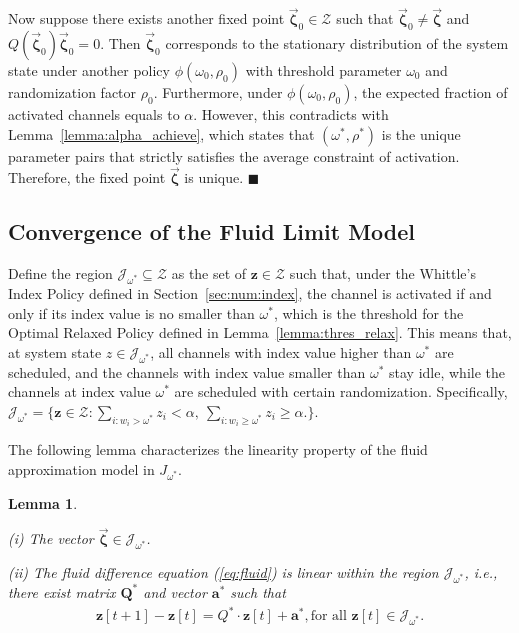 \documentclass[11pt,twocolumn]{IEEEtran}
\newtheorem{lemma}{Lemma}
\begin{document}
Now suppose there exists another fixed point $\vec{\bm \zeta}_0\in \mathcal{Z}$ such that $\vec{\bm \zeta}_0 \neq \vec{\bm \zeta}$ and $Q(\vec{\bm \zeta}_0)\vec{\bm \zeta}_0=0$. Then $\vec{\bm \zeta}_0$ corresponds to the stationary distribution of the system state under another policy $\phi(\omega_0, \rho_0)$ with threshold parameter $\omega_0$ and randomization factor $\rho_0$. Furthermore, under $\phi(\omega_0, \rho_0)$, the expected fraction of activated channels equals to $\alpha$. However, this contradicts with Lemma~\ref{lemma:alpha_achieve}, which states that $(\omega^*, \rho^*)$ is the unique parameter pairs that strictly satisfies the average constraint of activation. Therefore, the fixed point $\vec{\bm \zeta}$ is unique.
 \hfill $\blacksquare$

\subsection{Convergence of the Fluid Limit Model}

Define the region $\mathcal{J}_{\omega^*} \subseteq \mathcal{Z}$ as the set of $\bm z \in \mathcal{Z}$ such that, under the Whittle's Index Policy defined in Section~\ref{sec:num:index}, the channel is activated if and only if its index value is no smaller than $\omega^*$, which is the threshold for the Optimal Relaxed Policy defined in Lemma~\ref{lemma:thres_relax}. This means that, at system state $z \in \mathcal{J}_{\omega^*}$, all channels with index value higher than $\omega^*$ are scheduled, and the channels with index value smaller than $\omega^*$ stay idle, while the channels at index value $\omega^*$ are scheduled with certain randomization. Specifically, $\mathcal{J_{\omega^*}}=\{\bm z {\in} \mathcal{Z}: \sum_{i: w_i > \omega^*} z_i < \alpha, \ \sum_{i: w_i \geq \omega^*}z_i  \geq \alpha.\}$.

The following lemma characterizes the linearity property of the fluid approximation model in $J_{\omega^*}$.
\vspace{3pt}

\begin{lemma}\label{lemma:piecewiseL}

\noindent(i) The vector  $\vec{\bm \zeta} \in {\mathcal{J}_{\omega^*}}$.

\noindent(ii) The fluid difference equation (\ref{eq:fluid}) is linear within the region $\mathcal{J}_{\omega^*}$, i.e., there exist matrix $\bm Q^*$ and vector $\bm a^*$ such that
\begin{align}
\bm z[t{+}1]{-}\bm z[t]{=}Q^* \cdot \bm z[t]{+}\bm a^*, \text{for all \ } \bm z[t] \in \mathcal{J}_{\omega^*}.\label{eq:Q_star}
\end{align}
\end{lemma}
\end{document}
